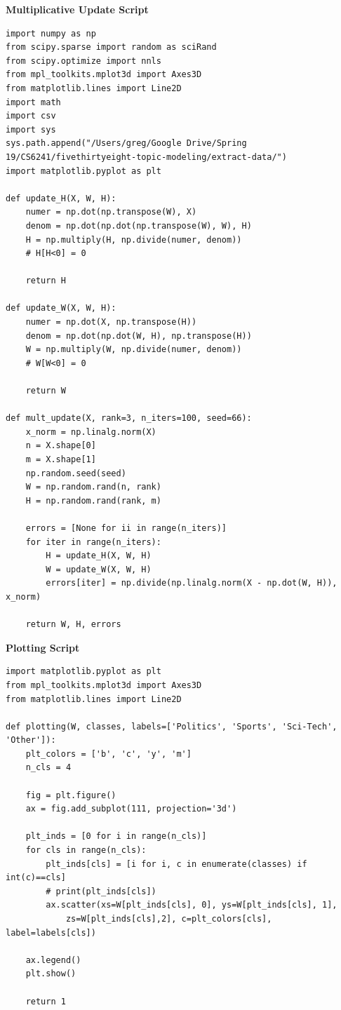\documentclass[12pt]{article}
\begin{document}
\textbf{Multiplicative Update Script}
\begin{lstlisting}
import numpy as np
from scipy.sparse import random as sciRand
from scipy.optimize import nnls
from mpl_toolkits.mplot3d import Axes3D
from matplotlib.lines import Line2D
import math
import csv
import sys
sys.path.append("/Users/greg/Google Drive/Spring 19/CS6241/fivethirtyeight-topic-modeling/extract-data/")
import matplotlib.pyplot as plt

def update_H(X, W, H):
    numer = np.dot(np.transpose(W), X)
    denom = np.dot(np.dot(np.transpose(W), W), H)
    H = np.multiply(H, np.divide(numer, denom))
    # H[H<0] = 0

    return H

def update_W(X, W, H):
    numer = np.dot(X, np.transpose(H))
    denom = np.dot(np.dot(W, H), np.transpose(H))
    W = np.multiply(W, np.divide(numer, denom))
    # W[W<0] = 0

    return W

def mult_update(X, rank=3, n_iters=100, seed=66):
    x_norm = np.linalg.norm(X)
    n = X.shape[0]
    m = X.shape[1]
    np.random.seed(seed)
    W = np.random.rand(n, rank)
    H = np.random.rand(rank, m)

    errors = [None for ii in range(n_iters)]
    for iter in range(n_iters):
        H = update_H(X, W, H)
        W = update_W(X, W, H)
        errors[iter] = np.divide(np.linalg.norm(X - np.dot(W, H)), x_norm)

    return W, H, errors
\end{lstlisting}

\textbf{Plotting Script}
\begin{lstlisting}
import matplotlib.pyplot as plt
from mpl_toolkits.mplot3d import Axes3D
from matplotlib.lines import Line2D

def plotting(W, classes, labels=['Politics', 'Sports', 'Sci-Tech', 'Other']):
    plt_colors = ['b', 'c', 'y', 'm']
    n_cls = 4

    fig = plt.figure()
    ax = fig.add_subplot(111, projection='3d')

    plt_inds = [0 for i in range(n_cls)]
    for cls in range(n_cls):
        plt_inds[cls] = [i for i, c in enumerate(classes) if int(c)==cls]
        # print(plt_inds[cls])
        ax.scatter(xs=W[plt_inds[cls], 0], ys=W[plt_inds[cls], 1],
            zs=W[plt_inds[cls],2], c=plt_colors[cls], label=labels[cls])

    ax.legend()
    plt.show()

    return 1
\end{lstlisting}
\end{document}
